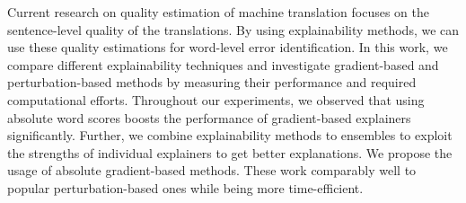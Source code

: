 Current research on quality estimation of machine translation focuses on the sentence-level quality of the translations. By using explainability methods, we can use these quality estimations for word-level error identification. In this work, we compare different explainability techniques and investigate gradient-based and perturbation-based methods by measuring their performance and required computational efforts. Throughout our experiments, we observed that using absolute word scores boosts the performance of gradient-based explainers significantly. Further, we combine explainability methods to ensembles to exploit the strengths of individual explainers to get better explanations. We propose the usage of absolute gradient-based methods. These work comparably well to popular perturbation-based ones while being more time-efficient.
